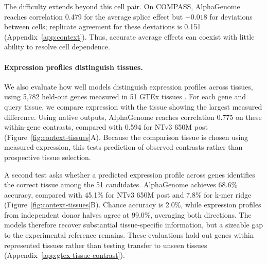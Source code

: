 The difficulty extends beyond this cell pair. On COMPASS,
AlphaGenome reaches correlation 0.479 for the average splice effect
but $-0.018$ for deviations between cells; replicate agreement for
these deviations is 0.151 (Appendix~\ref{app:context}).
Thus, accurate average effects can coexist with little ability to
resolve cell dependence.

\paragraph{Expression profiles distinguish tissues.}

We also evaluate how well models distinguish expression profiles across tissues,
using 5,782 held-out genes measured in 51 GTEx tissues \citep{gtex2020atlas}. For each gene and query tissue, we compare
expression with the tissue showing the largest measured difference.
Using native outputs, AlphaGenome reaches correlation 0.775 on these within-gene
contrasts, compared with 0.594 for NTv3 650M post
(Figure~\ref{fig:context-tissues}A). Because the comparison tissue is chosen using measured expression,
this tests prediction of observed contrasts rather than prospective tissue selection.

A second test asks whether a predicted expression profile across
genes identifies the correct tissue among the 51 candidates.
AlphaGenome achieves 68.6\% accuracy, compared with 45.1\% for
NTv3 650M post and 7.8\% for k-mer ridge
(Figure~\ref{fig:context-tissues}B). Chance accuracy is 2.0\%, while
expression profiles from independent donor halves agree at 99.0\%, averaging both directions. 
The models therefore recover substantial tissue-specific
information, but a sizeable gap to the experimental reference remains.
These evaluations hold out genes within represented tissues rather than testing transfer to unseen tissues
(Appendix~\ref{app:gtex-tissue-contrast}).



